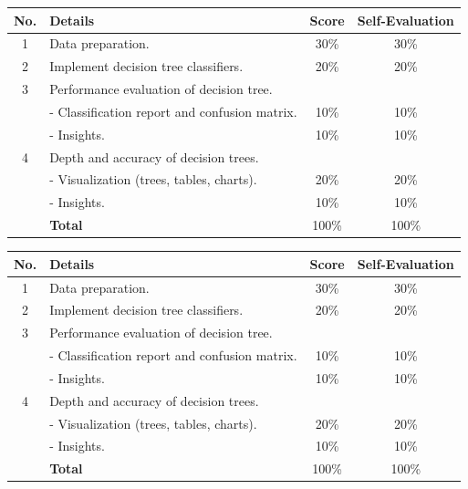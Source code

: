 \documentclass{article}
\begin{document}
    \begin{table}[h!]
    \centering
    \begin{tabular}{|c|p{10cm}|c|c|}
    \hline
    \textbf{No.} & \textbf{Details} & \textbf{Score} & \textbf{Self-Evaluation} \\
    \hline
    1 & Data preparation.  & 30\% & 30\%\\
    \hline
    2 & Implement decision tree classifiers. & 20\% & 20\%\\
    \hline
    3 & Performance evaluation of decision tree. &  & \\
    \hline
    & - Classification report and confusion matrix. & 10\% & 10\%\\
    \hline
    & - Insights. & 10\% & 10\%\\
    \hline
    4 & Depth and accuracy of decision trees. &  & \\
    \hline
    & - Visualization (trees, tables, charts). & 20\% & 20\%\\
    \hline
    & - Insights. & 10\% & 10\%\\
    \hline
    & \textbf{Total} & 100\% & 100\% \\
    \hline
    \end{tabular}
    \end{table}

    \begin{table}[h!]
    \centering
    \begin{tabular}{|c|p{10cm}|c|c|}
    \hline
    \textbf{No.} & \textbf{Details} & \textbf{Score} & \textbf{Self-Evaluation} \\
    \hline
    1 & Data preparation.  & 30\% & 30\%\\
    \hline
    2 & Implement decision tree classifiers. & 20\% & 20\%\\
    \hline
    3 & Performance evaluation of decision tree. &  & \\
    \hline
    & - Classification report and confusion matrix. & 10\% & 10\%\\
    \hline
    & - Insights. & 10\% & 10\%\\
    \hline
    4 & Depth and accuracy of decision trees. &  & \\
    \hline
    & - Visualization (trees, tables, charts). & 20\% & 20\%\\
    \hline
    & - Insights. & 10\% & 10\%\\
    \hline
    & \textbf{Total} & 100\% & 100\% \\
    \hline
    \end{tabular}
    \end{table}
\end{document}
